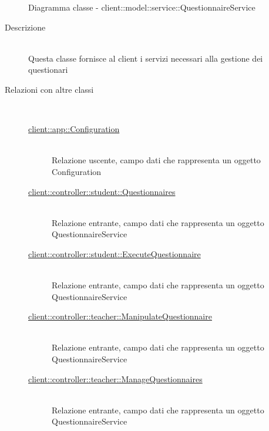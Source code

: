 \vspace{0.5cm}
\hypertarget{client::model::service::QuestionnaireService}{}
\begin{figure}[H]
	\centering
	\caption{Diagramma classe - client::model::service::QuestionnaireService}
\end{figure}\begin{description}
\item[Descrizione] \hfill \\
Questa classe fornisce al client i servizi necessari alla gestione dei questionari
\item[Relazioni con altre classi] \hfill \\
\vspace{-7mm}
\begin{description}
	\item[\hyperlink{client::app::Configuration}{client::app::Configuration}] \hfill \\
	Relazione uscente, campo dati che rappresenta un oggetto Configuration
	\item[\hyperlink{client::controller::student::Questionnaires}{client::controller::student::Questionnaires}] \hfill \\
	Relazione entrante, campo dati che rappresenta un oggetto QuestionnaireService
	\item[\hyperlink{client::controller::student::ExecuteQuestionnaire}{client::controller::student::ExecuteQuestionnaire}] \hfill \\
	Relazione entrante, campo dati che rappresenta un oggetto QuestionnaireService
	\item[\hyperlink{client::controller::teacher::ManipulateQuestionnaire}{client::controller::teacher::ManipulateQuestionnaire}] \hfill \\
	Relazione entrante, campo dati che rappresenta un oggetto QuestionnaireService
	\item[\hyperlink{client::controller::teacher::ManageQuestionnaires}{client::controller::teacher::ManageQuestionnaires}] \hfill \\
	Relazione entrante, campo dati che rappresenta un oggetto QuestionnaireService
\end{description}


\end{description}
